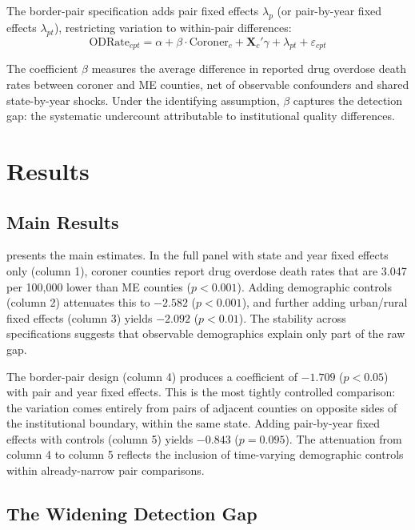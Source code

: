 \documentclass[12pt]{article}
\begin{document}
The border-pair specification adds pair fixed effects $\lambda_p$ (or pair-by-year fixed effects $\lambda_{pt}$), restricting variation to within-pair differences:
\begin{equation}
\text{ODRate}_{cpt} = \alpha + \beta \cdot \text{Coroner}_c + \mathbf{X}_c'\gamma + \lambda_{pt} + \varepsilon_{cpt}
\label{eq:border}
\end{equation}

The coefficient $\beta$ measures the average difference in reported drug overdose death rates between coroner and ME counties, net of observable confounders and shared state-by-year shocks. Under the identifying assumption, $\beta$ captures the detection gap: the systematic undercount attributable to institutional quality differences.

\section{Results}

\subsection{Main Results}

 presents the main estimates. In the full panel with state and year fixed effects only (column 1), coroner counties report drug overdose death rates that are 3.047 per 100,000 lower than ME counties ($p < 0.001$). Adding demographic controls (column 2) attenuates this to $-2.582$ ($p < 0.001$), and further adding urban/rural fixed effects (column 3) yields $-2.092$ ($p < 0.01$). The stability across specifications suggests that observable demographics explain only part of the raw gap.

The border-pair design (column 4) produces a coefficient of $-1.709$ ($p < 0.05$) with pair and year fixed effects. This is the most tightly controlled comparison: the variation comes entirely from pairs of adjacent counties on opposite sides of the institutional boundary, within the same state. Adding pair-by-year fixed effects with controls (column 5) yields $-0.843$ ($p = 0.095$). The attenuation from column 4 to column 5 reflects the inclusion of time-varying demographic controls within already-narrow pair comparisons.



\subsection{The Widening Detection Gap}
\end{document}
